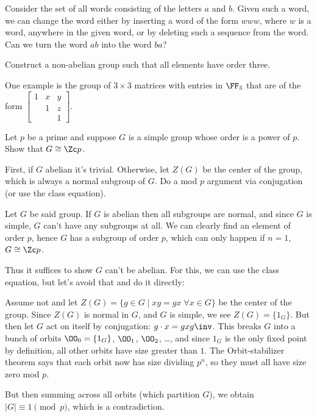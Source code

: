 \begin{problem}
	\gim
	Consider the set of all words consisting of the letters $a$ and $b$.
	Given such a word, we can change the word either
	by inserting a word of the form $www$,
	where $w$ is a word, anywhere in the given word,
	or by deleting such a sequence from the word.
	Can we turn the word $ab$ into the word $ba$?
	\begin{hint}
		Construct a non-abelian group such that all elements have order three.
	\end{hint}
	\begin{sol}
		One example is the group of $3 \times 3$
		matrices with entries in $\FF_3$ that are of the form
		$\begin{bmatrix}
			1 & x & y \\
			& 1 & z \\
			& & 1
		\end{bmatrix}$.
	\end{sol}
\end{problem}

\begin{problem}
	\yod
	Let $p$ be a prime and suppose $G$ is a simple group
	whose order is a power of $p$.
	Show that $G \cong \Zc p$.

	\begin{hint}
		First, if $G$ abelian it's trivial.
		Otherwise, let $Z(G)$ be the center of the group,
		which is always a normal subgroup of $G$.
		Do a mod $p$ argument via conjugation (or use the class equation).
	\end{hint}
	\begin{sol}
		Let $G$ be said group.
		If $G$ is abelian then all subgroups are normal,
		and since $G$ is simple, $G$ can't have any subgroups at all.
		We can clearly find an element of order $p$, hence $G$ has a subgroup
		of order $p$, which can only happen if $n=1$, $G \cong \Zc p$.

		Thus it suffices to show $G$ can't be abelian.
		For this, we can use the class equation, but let's avoid that and do it directly:

		Assume not and let $Z(G) = \{ g \in G \mid xg = gx \; \forall x \in G \}$
		be the center of the group.
		Since $Z(G)$ is normal in $G$, and $G$ is simple, we see $Z(G) = \{1_G\}$.
		But then let $G$ act on itself by conjugation: $g \cdot x = gxg\inv$.
		This breaks $G$ into a bunch of orbits $\OO_0 = \{1_G\}$, $\OO_1$, $\OO_2$, \dots,
		and since $1_G$ is the only fixed point by definition, all other orbits
		have size greater than $1$.
		The Orbit-stabilizer theorem says that each orbit now has size dividing $p^n$,
		so they must all have size zero mod $p$.

		But then summing across all orbits (which partition $G$),
		we obtain $\left\lvert G \right\rvert \equiv 1 \pmod p$,
		which is a contradiction.
	\end{sol}
\end{problem}
